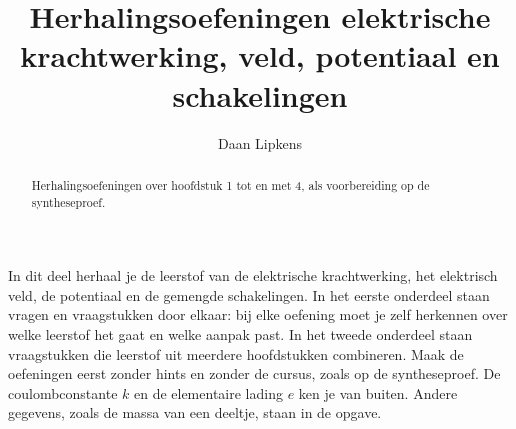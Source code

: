 \documentclass{ximera}
\title{Herhalingsoefeningen elektrische krachtwerking, veld, potentiaal en schakelingen}
\author{Daan Lipkens}
\begin{document}
\begin{abstract}
    Herhalingsoefeningen over hoofdstuk 1 tot en met 4, als voorbereiding op de syntheseproef.
\end{abstract}
\maketitle

In dit deel herhaal je de leerstof van de elektrische krachtwerking, het elektrisch veld, de potentiaal en de gemengde schakelingen. In het eerste onderdeel staan vragen en vraagstukken door elkaar: bij elke oefening moet je zelf herkennen over welke leerstof het gaat en welke aanpak past. In het tweede onderdeel staan vraagstukken die leerstof uit meerdere hoofdstukken combineren. Maak de oefeningen eerst zonder hints en zonder de cursus, zoals op de syntheseproef. De coulombconstante $k$ en de elementaire lading $e$ ken je van buiten. Andere gegevens, zoals de massa van een deeltje, staan in de opgave.
\end{document}
